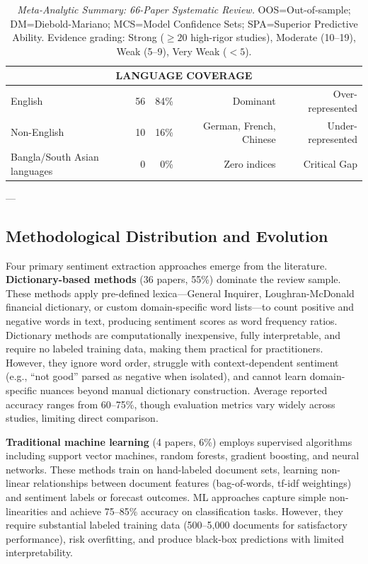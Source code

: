 \documentclass[11pt]{article}
\begin{document}
\begin{table}[H]
\begin{tabular}{|l|r|r|r|r|}
\hline
\multicolumn{5}{|c|}{\textbf{LANGUAGE COVERAGE}} \\
\hline
English & 56 & 84\% & Dominant & Over-represented \\
Non-English & 10 & 16\% & German, French, Chinese & Under-represented \\
Bangla/South Asian languages & 0 & 0\% & Zero indices & Critical Gap \\
\hline
\end{tabular}
\caption{\textit{Meta-Analytic Summary: 66-Paper Systematic Review.} OOS=Out-of-sample; DM=Diebold-Mariano; MCS=Model Confidence Sets; SPA=Superior Predictive Ability. Evidence grading: Strong ($\geq 20$ high-rigor studies), Moderate (10--19), Weak (5--9), Very Weak ($<5$).}
\label{tab:metasummary}
\end{table}

---

\subsection{Methodological Distribution and Evolution}

Four primary sentiment extraction approaches emerge from the literature. \textbf{Dictionary-based methods} (36 papers, 55\%) dominate the review sample. These methods apply pre-defined lexica---General Inquirer, Loughran-McDonald financial dictionary, or custom domain-specific word lists---to count positive and negative words in text, producing sentiment scores as word frequency ratios. Dictionary methods are computationally inexpensive, fully interpretable, and require no labeled training data, making them practical for practitioners. However, they ignore word order, struggle with context-dependent sentiment (e.g., ``not good'' parsed as negative when isolated), and cannot learn domain-specific nuances beyond manual dictionary construction. Average reported accuracy ranges from 60--75\%, though evaluation metrics vary widely across studies, limiting direct comparison.

\textbf{Traditional machine learning} (4 papers, 6\%) employs supervised algorithms including support vector machines, random forests, gradient boosting, and neural networks. These methods train on hand-labeled document sets, learning non-linear relationships between document features (bag-of-words, tf-idf weightings) and sentiment labels or forecast outcomes. ML approaches capture simple non-linearities and achieve 75--85\% accuracy on classification tasks. However, they require substantial labeled training data (500--5,000 documents for satisfactory performance), risk overfitting, and produce black-box predictions with limited interpretability.
\end{document}
